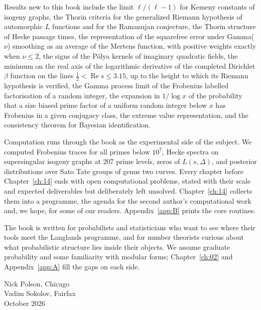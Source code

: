 Results new to this book include the limit $\ell/(\ell-1)$ for Kemeny constants of isogeny graphs, the Thorin criteria for the generalized Riemann hypothesis of automorphic $L$ functions and for the Ramanujan conjecture, the Thorin structure of Hecke passage times, the representation of the squarefree error under Gamma($\nu$) smoothing as an average of the Mertens function, with positive weights exactly when $\nu\le2$, the signs of the P\'olya kernels of imaginary quadratic fields, the minimum on the real axis of the logarithmic derivative of the completed Dirichlet $\beta$ function on the lines $\frac12<\operatorname{Re}s\le3.15$, up to the height to which its Riemann hypothesis is verified, the Gamma process limit of the Frobenius labelled factorisation of a random integer, the expansion in $1/\log x$ of the probability that a size biased prime factor of a uniform random integer below $x$ has Frobenius in a given conjugacy class, the extreme value representation, and the consistency theorem for Bayesian identification.

Computation runs through the book as the experimental side of the subject. We computed Frobenius traces for all primes below $10^7$, Hecke spectra on supersingular isogeny graphs at 207 prime levels, zeros of $L(s,\Delta)$, and posterior distributions over Sato Tate groups of genus two curves. Every chapter before Chapter~\ref{ch:14} ends with open computational problems, stated with their scale and expected deliverables but deliberately left unsolved. Chapter~\ref{ch:14} collects them into a programme, the agenda for the second author's computational work and, we hope, for some of our readers. Appendix~\ref{app:B} prints the core routines.

The book is written for probabilists and statisticians who want to see where their tools meet the Langlands programme, and for number theorists curious about what probabilistic structure lies inside their objects. We assume graduate probability and some familiarity with modular forms; Chapter~\ref{ch:02} and Appendix~\ref{app:A} fill the gaps on each side.

\bigskip
\noindent Nick Polson, Chicago\\
Vadim Sokolov, Fairfax\\
October 2026
